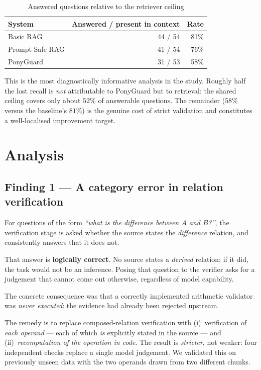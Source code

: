 \documentclass[conference]{IEEEtran}
\begin{document}
\begin{table}[t]
\caption{Answered questions relative to the retriever ceiling}
\label{tab:ceiling}
\centering
\footnotesize
\begin{tabular}{@{}lrr@{}}
\toprule
System & Answered / present in context & Rate \\
\midrule
Basic RAG          & 44 / 54 & 81\% \\
Prompt-Safe RAG    & 41 / 54 & 76\% \\
PonyGuard          & 31 / 53 & 58\% \\
\bottomrule
\end{tabular}
\end{table}

This is the most diagnostically informative analysis in the study. Roughly half
the lost recall is \emph{not} attributable to PonyGuard but to retrieval: the
shared ceiling covers only about $52\%$ of answerable questions. The remainder
($58\%$ versus the baseline's $81\%$) is the genuine cost of strict validation and
constitutes a well-localised improvement target.

\section{Analysis}

\subsection{Finding 1 --- A category error in relation verification}
\label{sec:finding-category}

For questions of the form \emph{``what is the difference between $A$ and $B$?''},
the verification stage is asked whether the source states the \emph{difference}
relation, and consistently answers that it does not.

That answer is \textbf{logically correct}. No source states a \emph{derived}
relation; if it did, the task would not be an inference. Posing that question to
the verifier asks for a judgement that cannot come out otherwise, regardless of
model capability.

The concrete consequence was that a correctly implemented arithmetic validator
was \emph{never executed}: the evidence had already been rejected upstream.

The remedy is to replace composed-relation verification with (i)~verification of
\emph{each operand} --- each of which \emph{is} explicitly stated in the source
--- and (ii)~\emph{recomputation of the operation in code}. The result is
\emph{stricter}, not weaker: four independent checks replace a single model
judgement. We validated this on previously unseen data with the two operands
drawn from two different chunks.
\end{document}
